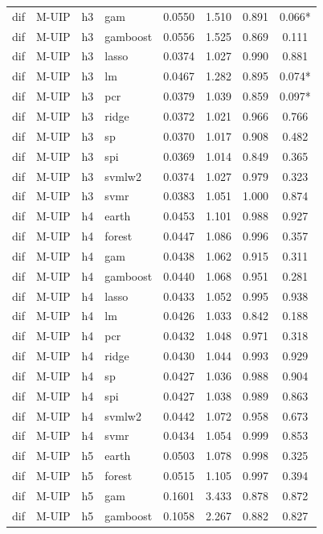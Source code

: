 \begin{ThreePartTable}
\begin{longtable}[t]{llclcccc}
dif & M-UIP & h3 & gam & 0.0550 & 1.510 & 0.891 & 0.066*\\
dif & M-UIP & h3 & gamboost & 0.0556 & 1.525 & 0.869 & 0.111\\
dif & M-UIP & h3 & lasso & 0.0374 & 1.027 & 0.990 & 0.881\\
dif & M-UIP & h3 & lm & 0.0467 & 1.282 & 0.895 & 0.074*\\
dif & M-UIP & h3 & pcr & 0.0379 & 1.039 & 0.859 & 0.097*\\
dif & M-UIP & h3 & ridge & 0.0372 & 1.021 & 0.966 & 0.766\\
dif & M-UIP & h3 & sp & 0.0370 & 1.017 & 0.908 & 0.482\\
dif & M-UIP & h3 & spi & 0.0369 & 1.014 & 0.849 & 0.365\\
dif & M-UIP & h3 & svmlw2 & 0.0374 & 1.027 & 0.979 & 0.323\\
dif & M-UIP & h3 & svmr & 0.0383 & 1.051 & 1.000 & 0.874\\
\addlinespace
dif & M-UIP & h4 & earth & 0.0453 & 1.101 & 0.988 & 0.927\\
dif & M-UIP & h4 & forest & 0.0447 & 1.086 & 0.996 & 0.357\\
dif & M-UIP & h4 & gam & 0.0438 & 1.062 & 0.915 & 0.311\\
dif & M-UIP & h4 & gamboost & 0.0440 & 1.068 & 0.951 & 0.281\\
dif & M-UIP & h4 & lasso & 0.0433 & 1.052 & 0.995 & 0.938\\
dif & M-UIP & h4 & lm & 0.0426 & 1.033 & 0.842 & 0.188\\
dif & M-UIP & h4 & pcr & 0.0432 & 1.048 & 0.971 & 0.318\\
dif & M-UIP & h4 & ridge & 0.0430 & 1.044 & 0.993 & 0.929\\
dif & M-UIP & h4 & sp & 0.0427 & 1.036 & 0.988 & 0.904\\
dif & M-UIP & h4 & spi & 0.0427 & 1.038 & 0.989 & 0.863\\
dif & M-UIP & h4 & svmlw2 & 0.0442 & 1.072 & 0.958 & 0.673\\
dif & M-UIP & h4 & svmr & 0.0434 & 1.054 & 0.999 & 0.853\\
\addlinespace
dif & M-UIP & h5 & earth & 0.0503 & 1.078 & 0.998 & 0.325\\
dif & M-UIP & h5 & forest & 0.0515 & 1.105 & 0.997 & 0.394\\
dif & M-UIP & h5 & gam & 0.1601 & 3.433 & 0.878 & 0.872\\
dif & M-UIP & h5 & gamboost & 0.1058 & 2.267 & 0.882 & 0.827\\

\end{longtable}
\end{ThreePartTable}
